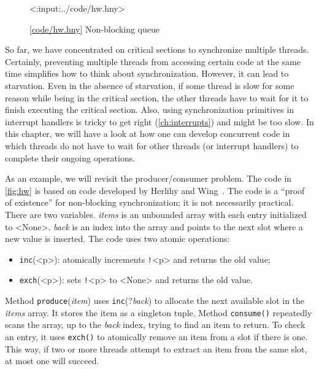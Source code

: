 \documentclass{report}
\newcommand{\harmonylink}[1]{%
[\href{https://harmony.cs.cornell.edu/#1}{\underline{#1}}]%
}
\newenvironment{code}{
\tcolorbox
}{
\endtcolorbox
}
\begin{document}
{\begin{figure}
\begin{code}
<{:input:../code/hw.hny}>
\end{code}
\caption{\harmonylink{code/hw.hny} Non-blocking queue}
\label{fig:hw}
\end{figure}

So far, we have concentrated on critical sections to synchronize multiple
threads.  Certainly, preventing multiple threads from accessing
certain code at the same time simplifies how to think about synchronization.
However, it can lead to starvation.  Even in the absence of starvation,
if some thread is slow for some reason while being in the critical section,
the other threads have to wait for it to finish executing the critical section.
Also, using synchronization primitives in interrupt handlers is tricky
to get right (\autoref{ch:interrupts}) and might be too slow.
In this chapter, we will have a look at how one can develop concurrent
code in which threads do not have to wait for other threads (or interrupt
handlers) to complete their ongoing operations.

As an example, we will revisit the producer/consumer problem.
The code in \autoref{fig:hw} is based on code developed by Herlihy and
Wing~\cite{HW87}.
The code is a ``proof of existence'' for non-blocking synchronization; it
is not necessarily practical.
There are two variables.  \textit{items} is an unbounded array with each
entry initialized to <{None}>.  \textit{back} is an index into the
array and points to the next slot where a new value is inserted.
The code uses two atomic operations:
\begin{itemize}
\item \texttt{inc}(<{p}>): atomically increments \texttt{!}<{p}> and returns
the old value;
\item \texttt{exch}(<{p}>): sets \texttt{!}<{p}> to <{None}> and returns
the old value.
\end{itemize}

Method \texttt{produce}(\textit{item}) uses \texttt{inc}(?\textit{back})
to allocate
the next available slot in the \textit{items} array.
It stores the item as a singleton tuple.
Method \texttt{consume()} repeatedly scans the array, up to the
\textit{back} index, trying to find an item to return.
To check an entry, it uses \texttt{exch()}
to atomically remove an item from a slot if there is one.
This way, if two or more threads attempt to extract an item from
the same slot, at most one will succeed.

}
\end{document}
